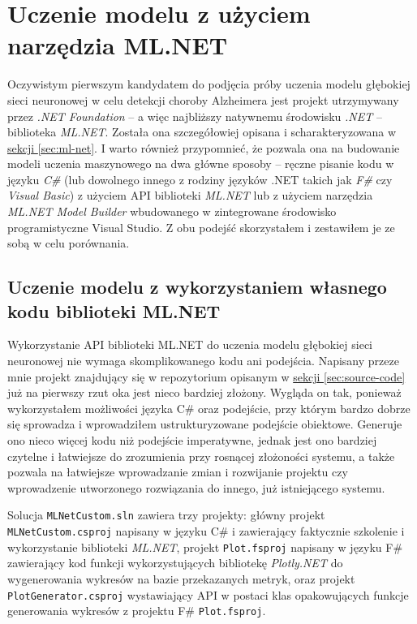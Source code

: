 \section{Uczenie modelu z użyciem narzędzia ML.NET}

Oczywistym pierwszym kandydatem do podjęcia próby uczenia modelu głębokiej sieci neuronowej w celu detekcji choroby Alzheimera jest projekt utrzymywany przez \emph{.NET Foundation} -- a więc najbliższy natywnemu środowisku \emph{.NET} -- biblioteka \emph{ML.NET}.
Została ona szczegółowiej opisana i scharakteryzowana w \hyperref[sec:ml-net]{sekcji \ref*{sec:ml-net}}.
I warto również przypomnieć, że pozwala ona na budowanie modeli uczenia maszynowego na dwa główne sposoby -- ręczne pisanie kodu w języku \emph{C\#} (lub dowolnego innego z rodziny języków .NET takich jak \emph{F\#} czy \emph{Visual Basic}) z użyciem API biblioteki \emph{ML.NET} lub z użyciem narzędzia \emph{ML.NET Model Builder} wbudowanego w zintegrowane środowisko programistyczne Visual Studio.
Z obu podejść skorzystałem i zestawiłem je ze sobą w celu porównania.

\subsection{Uczenie modelu z wykorzystaniem własnego kodu biblioteki ML.NET}

Wykorzystanie API biblioteki ML.NET do uczenia modelu głębokiej sieci neuronowej nie wymaga skomplikowanego kodu ani podejścia.
Napisany przeze mnie projekt znajdujący się w repozytorium opisanym w \hyperref[sec:source-code]{sekcji \ref*{sec:source-code}} już na pierwszy rzut oka jest nieco bardziej złożony.
Wygląda on tak, ponieważ wykorzystałem możliwości języka C\# oraz podejście, przy którym bardzo dobrze się sprowadza i wprowadziłem ustrukturyzowane podejście obiektowe.
Generuje ono nieco więcej kodu niż podejście imperatywne, jednak jest ono bardziej czytelne i łatwiejsze do zrozumienia przy rosnącej złożoności systemu, a także pozwala na łatwiejsze wprowadzanie zmian i rozwijanie projektu czy wprowadzenie utworzonego rozwiązania do innego, już istniejącego systemu.

Solucja \lstinline{MLNetCustom.sln} zawiera trzy projekty: główny projekt \lstinline{MLNetCustom.csproj} napisany w języku C\# i zawierający faktycznie szkolenie i wykorzystanie biblioteki \emph{ML.NET}, projekt \lstinline{Plot.fsproj} napisany w języku F\# zawierający kod funkcji wykorzystujących bibliotekę \emph{Plotly.NET} do wygenerowania wykresów na bazie przekazanych metryk, oraz projekt \lstinline{PlotGenerator.csproj} wystawiający API w postaci klas opakowujących funkcje generowania wykresów z projektu F\# \lstinline{Plot.fsproj}.

